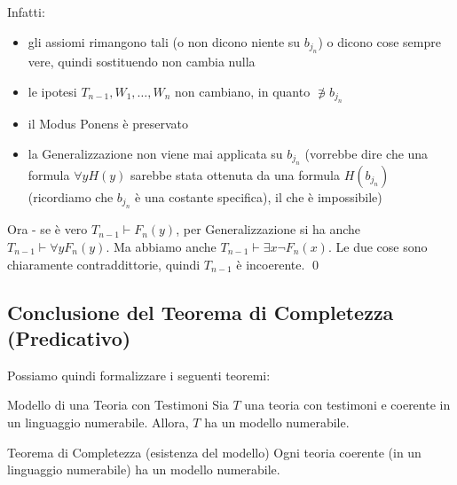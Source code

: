 \documentclass[a4paper,11pt]{report}
\begin{document}
\begin{proofframe}{}{}
\begin{itemize}
            Infatti:
            \begin{itemize}
                \item gli assiomi rimangono tali (o non dicono niente su \( b_{j_n} \)) o dicono cose sempre vere, quindi sostituendo non cambia nulla
                \item le ipotesi \( T_{n-1}, W_1, \dots, W_n \) non cambiano, in quanto \( \not \ni b_{j_n} \)
                \item il Modus Ponens è preservato
                \item la Generalizzazione non viene mai applicata su \( b_{j_n} \) (vorrebbe dire che una formula \( \forall y H(y) \) sarebbe stata ottenuta da una formula \( H(b_{j_n}) \) (ricordiamo che \( b_{j_n} \) è una costante specifica), il che è impossibile)
            \end{itemize}

            Ora - se è vero \( T_{n-1} \vdash F_n(y) \), per Generalizzazione si ha anche \( T_{n-1} \vdash \forall y F_n(y) \). Ma abbiamo anche \( T_{n-1} \vdash \exists x \neg F_n(x) \). Le due cose sono chiaramente contraddittorie, quindi \( T_{n-1} \) è incoerente. \qed
    \end{itemize}
\end{proofframe}

\subsection{Conclusione del Teorema di Completezza (Predicativo)}
Possiamo quindi formalizzare i seguenti teoremi:

\begin{thmframe}{Modello di una Teoria con Testimoni}{}
    Sia \( T \) una teoria con testimoni e coerente in un linguaggio numerabile. Allora, \( T \) ha un modello numerabile.
\end{thmframe}

\begin{thmframe}{Teorema di Completezza (esistenza del modello)}{}
    Ogni teoria coerente (in un linguaggio numerabile) ha un modello numerabile.
\end{thmframe}
\end{document}

